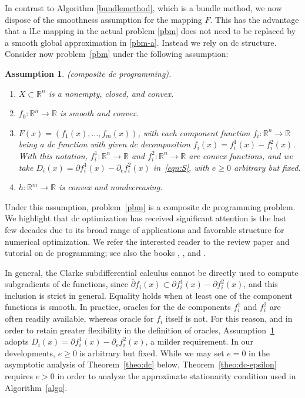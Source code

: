 \documentclass[smallextended,envcountsect]{svjour3}
\newtheorem{assumption}{Assumption}
\newcommand{\fc}[2]{: #1 \rightarrow #2}
\renewcommand{\Re}{\mathbb{R}}
\begin{document}
In contrast to Algorithm \ref{bundlemethod}, which is a bundle method, we now dispose of the smoothness assumption for the mapping $F$. This has the advantage that a lLc mapping in the actual problem \eqref{pbm} does not need to be replaced by a smooth global approximation in \eqref{pbm-a}. Instead we rely on dc structure. 
Consider now problem~\eqref{pbm} under the following assumption:
\begin{assumption}{\rm (composite dc programming).}\label{assumptions-dc}
\mbox{ }
\begin{enumerate}[label=(\alph*), start=1]
\item $X\subset \Re^n$ is a nonempty, closed, and convex.
\item $f_0\fc{\Re^n}{\Re}$ is smooth and  convex.
\item $F(x)=(f_1(x),\ldots,f_m(x))$, with each component function $f_i\fc{\Re^n}{\Re}$ being a dc function with given dc decomposition $f_i(x)=f_{i}^1(x)-f_{i}^2(x)$. With this notation, $f_{i}^1\fc{\Re^n}{\Re}$ and $f_{i}^2\fc{\Re^n}{\Re}$ are convex functions, and 
we take $D_i(x)=\partial f_i^1(x)-\partial_e f_i^2(x)$ in~\eqref{eqn:S}, with $e\geq0$ arbitrary but fixed.%
\item $h\fc{\Re^m}{\Re}$ is  convex and nondecreasing. %
\end{enumerate}
\end{assumption}

Under this assumption, problem~\eqref{pbm} is a composite dc programming problem. We highlight that dc optimization has received significant attention is the last few decades due to its broad range of applications and favorable structure for numerical optimization. We refer the interested reader to the review paper \cite{LeThi_Tao_2018} and tutorial \cite{Oliveira_ABC_2020} on dc programming; see also the books \cite[\S\, 6.H, 6.I]{Royset_Wets_2021}, \cite[Chapter 7]{Cui_Pang_2022}, and \cite[\S\, 4.6]{WWBook}.

In general, the Clarke subdifferential calculus cannot be directly used to compute subgradients of dc functions, since $\bar \partial f_i(x) \subset \partial f_i^1(x)-\partial f_i^2(x)$, and this inclusion is strict in general. Equality holds when at least one of the component functions is smooth. In practice,  oracles for the dc components $f_i^1$ and $f_i^2$ are often readily available, whereas oracle for $f_i$ itself is not. For this reason, and in order to retain greater flexibility in the definition of oracles, Assumption~\ref{assumptions-dc} adopts
$D_i(x)=\partial f_i^1(x)-\partial_e f_i^2(x)$, a milder requirement. In our developments, $e\geq0$ is arbitrary but fixed. While we may set $e=0$ in the asymptotic analysis of Theorem~\ref{theo:dc} below, Theorem~\ref{theo:dc-epsilon} requires $e>0$ in order to analyze the approximate stationarity condition used in Algorithm~\ref{algo}.
\end{document}

